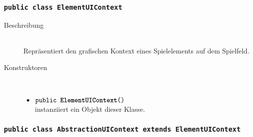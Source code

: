 \subsubsection{\normalfont \texttt{public class \textbf{ElementUIContext}}}

\begin{description}
\item[Beschreibung] \hfill \\ Repräsentiert den grafischen Kontext eines Spielelements auf dem Spielfeld.
\item[Konstruktoren] \hfill \\
	\vspace{-.8cm}
	\begin{itemize}
		\item $\texttt{public \textbf{ElementUIContext}()}$ \\ instanziiert ein Objekt dieser Klasse.

	
	\end{itemize}
\end{description}
	
	
	
	\subsubsection{\normalfont \texttt{public class \textbf{AbstractionUIContext} extends ElementUIContext}}

